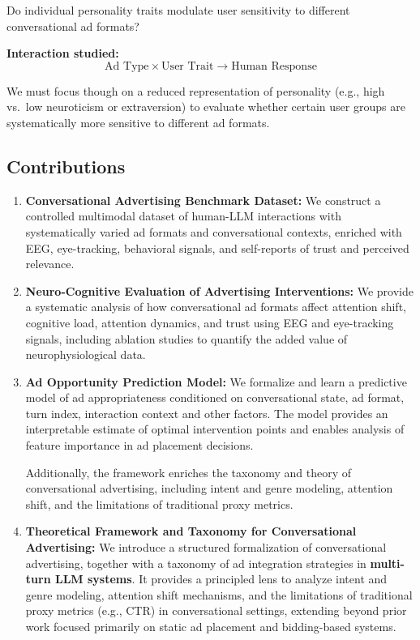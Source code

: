 \documentclass{article}
\begin{document}
Do individual personality traits modulate user sensitivity to different conversational ad formats?

\vspace{0.3cm}
\textbf{Interaction studied:}
\[
\text{Ad Type} \times \text{User Trait} \rightarrow \text{Human Response}
\]

\vspace{0.2cm}
We must focus though on a reduced representation of personality (e.g., high vs.\ low neuroticism or extraversion) to evaluate whether certain user groups are systematically more sensitive to different ad formats.
\newpage

\subsection{Contributions}
\label{Contributions}
\begin{enumerate}
    \item \textbf{Conversational Advertising Benchmark Dataset:} 
    We construct a controlled multimodal dataset of human-LLM interactions with systematically varied ad formats and conversational contexts, enriched with EEG, eye-tracking, behavioral signals, and self-reports of trust and perceived relevance.

    \item \textbf{Neuro-Cognitive Evaluation of Advertising Interventions:} 
    We provide a systematic analysis of how conversational ad formats affect attention shift, cognitive load, attention dynamics, and trust using EEG and eye-tracking signals, including ablation studies to quantify the added value of neurophysiological data.
    
    
    \item \textbf{Ad Opportunity Prediction Model:} 
    We formalize and learn a predictive model of ad appropriateness conditioned on conversational state, ad format, turn index, interaction context and other factors. The model provides an interpretable estimate of optimal intervention points and enables analysis of feature importance in ad placement decisions.

    Additionally, the framework enriches the taxonomy and theory of conversational advertising, including intent and genre modeling, attention shift, and the limitations of traditional proxy metrics.

    \item \textbf{Theoretical Framework and Taxonomy for Conversational Advertising:} 
    We introduce a structured formalization of conversational advertising, together with a taxonomy of ad integration strategies in \textbf{multi-turn LLM systems}. It provides a principled lens to analyze intent and genre modeling, attention shift mechanisms, and the limitations of traditional proxy metrics (e.g., CTR) in conversational settings, extending beyond prior work focused primarily on static ad placement and bidding-based systems.

\end{enumerate}
\end{document}
